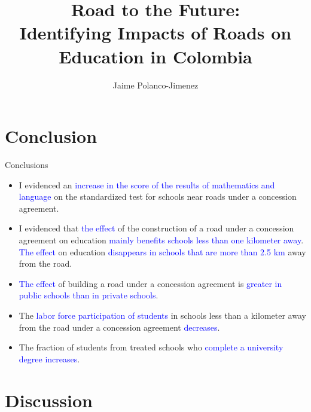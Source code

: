 \documentclass[9pt]{beamer}
\begin{document}
\section{Conclusion}


\begin{frame}{Conclusions}
\justifying
\begin{itemize}
     \item I evidenced an \textcolor{blue}{increase in the score of the results of mathematics and language} on the standardized test for schools near roads under a concession agreement.
    
    \item I evidenced that \textcolor{blue}{the effect} of the construction of a road under a concession agreement on education \textcolor{blue}{mainly benefits schools less than one kilometer away}. \textcolor{blue}{The effect} on education \textcolor{blue}{disappears in schools that are more than 2.5 km} away from the road.

    \item \textcolor{blue}{The effect} of building a road under a concession agreement is \textcolor{blue}{greater in public schools than in private schools}.

    \item The \textcolor{blue}{labor force participation of students} in schools less than a kilometer away from the road under a concession agreement \textcolor{blue}{decreases}.
    
    \item The fraction of students from treated schools who \textcolor{blue}{complete a university degree increases}. 
    
 
    
\end{itemize}

\end{frame}

\section{Discussion}


\begin{frame}
  \title[PhD in Economic Sciences]{Road to the Future: \\ Identifying Impacts of Roads on Education in Colombia}
  \author[IEA World Congress 2023]{Jaime Polanco-Jimenez}
  \titlepage
\end{frame}
\end{document}
